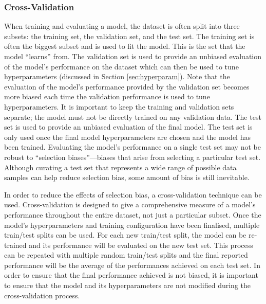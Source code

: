 \subsubsection{Cross-Validation}

When training and evaluating a model, the dataset is often split into three subsets: the training set, the validation set, and the test set. The training set is often the biggest subset and is used to fit the model. This is the set that the model ``learns'' from. The validation set is used to provide an unbiased evaluation of the model's performance on the dataset which can then be used to tune hyperparameters (discussed in Section \ref{sec:hyperparam}). Note that the evaluation of the model's performance provided by the validation set becomes more biased each time the validation performance is used to tune hyperparameters. It is important to keep the training and validation sets separate; the model must not be directly trained on any validation data. The test set is used to provide an unbiased evaluation of the final model. The test set is only used once the final model hyperparameters are chosen and the model has been trained. Evaluating the model's performance on a single test set may not be robust to ``selection biases''---biases that arise from selecting a particular test set. Although curating a test set that represents a wide range of possible data samples can help reduce selection bias, some amount of bias is still inevitable.

In order to reduce the effects of selection bias, a cross-validation technique can be used. Cross-validation is designed to give a comprehensive measure of a model's performance throughout the entire dataset, not just a particular subset.  Once the model's hyperparameters and training configuration have been finalised, multiple train/test splits can be used. For each new train/test split, the model can be re-trained and its performance will be evaluated on the new test set. This process can be repeated with multiple random train/test splits and the final reported performance will be the average of the performances achieved on each test set. In order to ensure that the final performance achieved is not biased, it is important to ensure that the model and its hyperparameters are not modified during the cross-validation process.

